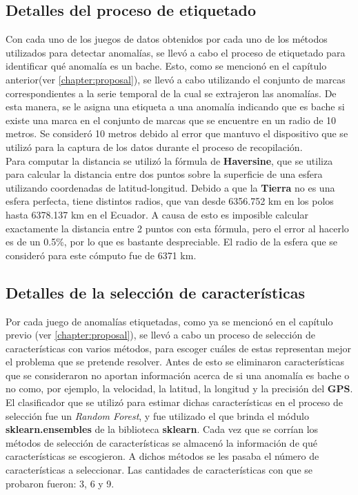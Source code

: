 	\subsection{Detalles del proceso de etiquetado}
		Con cada uno de los juegos de datos obtenidos por cada uno de los métodos utilizados para detectar anomalías, se llevó a cabo
		el proceso de etiquetado para identificar qué anomalía es un bache. Esto, como se mencionó en el capítulo anterior(ver \ref{chapter:proposal}),
		se llevó a cabo utilizando el conjunto de marcas correspondientes a la serie temporal de la cual se extrajeron las anomalías. De esta manera, se
		le asigna una etiqueta a una anomalía indicando que es bache si existe una marca en el conjunto de marcas que se encuentre en un radio de 10
		metros. Se consideró 10 metros debido al error que mantuvo el dispositivo que se utilizó para la captura de los datos durante el proceso de
		recopilación.\\
		\indent Para computar la distancia se utilizó la fórmula de \textbf{Haversine}, que se utiliza para calcular la distancia entre dos puntos sobre la
		superficie de una esfera utilizando coordenadas de latitud-longitud. Debido a que la \textbf{Tierra} no es una esfera perfecta, tiene
		distintos radios, que van desde 6356.752 km en los polos hasta 6378.137 km en el Ecuador. A causa de esto es imposible calcular exactamente la
		distancia entre 2 puntos con esta fórmula, pero el error al hacerlo es de un 0.5\%, por lo que es bastante despreciable. El radio de la esfera
		que se consideró para este cómputo fue de 6371 km.\\

	\subsection{Detalles de la selección de características}
		Por cada juego de anomalías etiquetadas, como ya se mencionó en el capítulo previo (ver \ref{chapter:proposal}), se llevó a cabo un proceso
		de selección de características con varios métodos, para escoger cuáles de estas representan mejor el problema que se pretende resolver.
		Antes de esto se eliminaron características que se consideraron no aportan información acerca de si una anomalía es bache o no como, por ejemplo,
		la velocidad, la latitud, la longitud y la precisión del \textbf{GPS}.\\
		\indent El clasificador que se utilizó para estimar dichas características en el proceso de selección fue un \emph{Random Forest}, y fue
		utilizado el que brinda el módulo \textbf{sklearn.ensembles} de la biblioteca \textbf{sklearn}. Cada vez que se corrían los métodos de selección
		de características se almacenó la información de qué características se escogieron. A dichos métodos se les pasaba el número de
		características a seleccionar. Las cantidades de características con que se probaron fueron: 3, 6 y 9.\\

